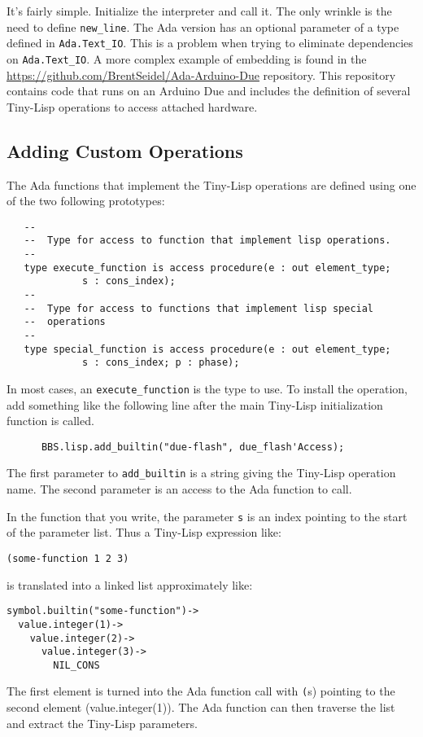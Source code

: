 \documentclass[10pt, openany]{book}
\newcommand{\package}[1]{\texttt{#1}}
\newcommand{\function}[1]{\texttt{#1}}
\newcommand{\keyword}[1]{\texttt{#1}}
\newcommand{\datatype}[1]{\texttt{#1}}
\newcommand{\tl}{Tiny-Lisp}
\begin{document}
It's fairly simple.  Initialize the interpreter and call it.  The only wrinkle is the need to define \function{new\_line}.  The Ada version has an optional parameter of a type defined in \package{Ada.Text\_IO}.  This is a problem when trying to eliminate dependencies on \package{Ada.Text\_IO}.  A more complex example of embedding is found in the \url{https://github.com/BrentSeidel/Ada-Arduino-Due} repository.  This repository contains code that runs on an Arduino Due and includes the definition of several \tl{} operations to access attached hardware.

\subsection{Adding Custom Operations}
The Ada functions that implement the \tl{} operations are defined using one of the two following prototypes:
\begin{lstlisting}
   --
   --  Type for access to function that implement lisp operations.
   --
   type execute_function is access procedure(e : out element_type;
             s : cons_index);
   --
   --  Type for access to functions that implement lisp special
   --  operations
   --
   type special_function is access procedure(e : out element_type;
             s : cons_index; p : phase);
\end{lstlisting}
In most cases, an \datatype{execute\_function} is the type to use.  To install the operation, add something like the following line after the main \tl{} initialization function is called.
\begin{lstlisting}
      BBS.lisp.add_builtin("due-flash", due_flash'Access);
\end{lstlisting}
The first parameter to \keyword{add\_builtin} is a string giving the \tl{} operation name.  The second parameter is an access to the Ada function to call.

In the function that you write, the parameter \keyword{s} is an index pointing to the start of the parameter list.  Thus a \tl{} expression like:
\lstset{language=[Tiny]Lisp}
\begin{lstlisting}
(some-function 1 2 3)
\end{lstlisting}
is translated into a linked list approximately like:
\begin{lstlisting}
symbol.builtin("some-function")->
  value.integer(1)->
    value.integer(2)->
      value.integer(3)->
        NIL_CONS
\end{lstlisting}
The first element is turned into the Ada function call with \keyword(s) pointing to the second element (value.integer(1)).  The Ada function can then traverse the list and extract the \tl{} parameters.
\lstset{language=Ada}
\end{document}
